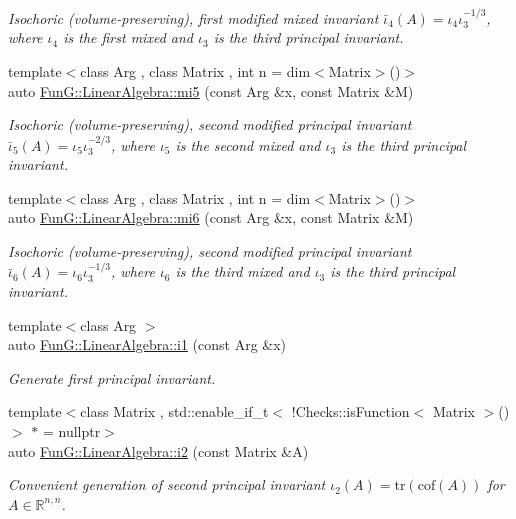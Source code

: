 \begin{DoxyCompactItemize}
\begin{DoxyCompactList}\small\item\em Isochoric (volume-\/preserving), first modified mixed invariant $ \bar\iota_4(A)=\iota_4\iota_3^{-1/3} $, where $\iota_4$ is the first mixed and $\iota_3$ is the third principal invariant. \end{DoxyCompactList}\item 
{\footnotesize template$<$class Arg , class Matrix , int n = dim$<$\-Matrix$>$()$>$ }\\auto \hyperlink{group__InvariantGroup_ga189bc682b34d13902da335c5eb502faa}{Fun\-G\-::\-Linear\-Algebra\-::mi5} (const Arg \&x, const Matrix \&M)
\begin{DoxyCompactList}\small\item\em Isochoric (volume-\/preserving), second modified principal invariant $ \bar\iota_5(A)=\iota_5\iota_3^{-2/3} $, where $\iota_5$ is the second mixed and $\iota_3$ is the third principal invariant. \end{DoxyCompactList}\item 
{\footnotesize template$<$class Arg , class Matrix , int n = dim$<$\-Matrix$>$()$>$ }\\auto \hyperlink{group__InvariantGroup_ga3e451f9e15fa95080f81d0c0f69f93e6}{Fun\-G\-::\-Linear\-Algebra\-::mi6} (const Arg \&x, const Matrix \&M)
\begin{DoxyCompactList}\small\item\em Isochoric (volume-\/preserving), second modified principal invariant $ \bar\iota_6(A)=\iota_6\iota_3^{-1/3} $, where $\iota_6$ is the third mixed and $\iota_3$ is the third principal invariant. \end{DoxyCompactList}\item 
{\footnotesize template$<$class Arg $>$ }\\auto \hyperlink{group__InvariantGroup_gafaead59b618d87239270f8eca2bf75c8}{Fun\-G\-::\-Linear\-Algebra\-::i1} (const Arg \&x)
\begin{DoxyCompactList}\small\item\em Generate first principal invariant. \end{DoxyCompactList}\item 
{\footnotesize template$<$class Matrix , std\-::enable\-\_\-if\-\_\-t$<$ !\-Checks\-::is\-Function$<$ Matrix $>$() $>$ $\ast$  = nullptr$>$ }\\auto \hyperlink{group__InvariantGroup_ga9e442bab8f203bcd5634a3d0e65bf802}{Fun\-G\-::\-Linear\-Algebra\-::i2} (const Matrix \&A)
\begin{DoxyCompactList}\small\item\em Convenient generation of second principal invariant $ \iota_2(A)=\mathrm{tr}(\mathrm{cof}(A)) $ for $A\in\mathbb{R}^{n,n}$. \end{DoxyCompactList}\item 

\end{DoxyCompactItemize}
